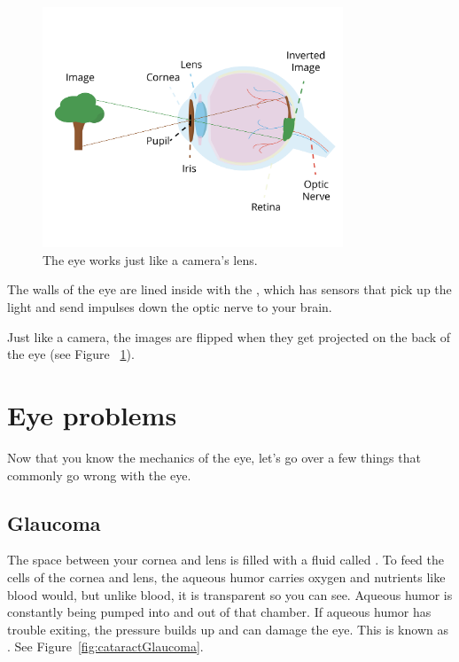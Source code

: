 \begin{figure}[htbp]
    \centering
    \includegraphics[width=0.8\textwidth]{eyeDiagram.png}
    \caption{The eye works just like a camera's lens.}
    \label{fig:eyeDiagram}
\end{figure}

The walls of the eye are lined inside with the , which has 
sensors that pick up the light and send impulses down the optic
nerve to your brain.

Just like a camera, the images are flipped when they get projected on
the back of the eye (see Figure ~\ref{fig:eyeDiagram}). 

\section{Eye problems}

Now that you know the mechanics of the eye, let's go over a few
things that commonly go wrong with the eye.

\subsection{Glaucoma}
The space between your cornea and lens is filled with a fluid called
. To feed the cells of the cornea and lens,
the aqueous humor carries oxygen and nutrients like blood would, but unlike blood,
it is transparent so you can see. Aqueous humor is constantly being
pumped into and out of that chamber. If aqueous humor has trouble
exiting, the pressure builds up and can damage the eye. This is known
as . See Figure~\ref{fig:cataractGlaucoma}.

